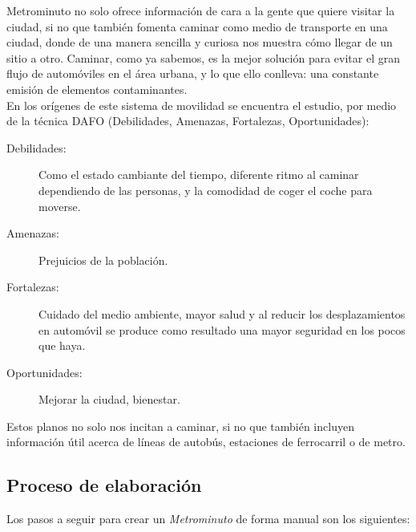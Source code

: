 Metrominuto no solo ofrece información de cara a la gente que quiere visitar la ciudad, si no que también fomenta caminar como medio de transporte en una ciudad, donde de una manera sencilla y curiosa nos muestra cómo llegar de un sitio a otro. Caminar, como ya sabemos, es la mejor solución para evitar el gran flujo de automóviles en el área urbana, y lo que ello conlleva: una constante emisión de elementos contaminantes. \\
En los orígenes de este sistema de movilidad se encuentra el estudio, por medio de la técnica DAFO (Debilidades, Amenazas, Fortalezas, Oportunidades):

\begin{description}
	\item[Debilidades:] Como el estado cambiante del tiempo, diferente ritmo al caminar dependiendo de las personas, y la comodidad de coger el coche para moverse.
	\item[Amenazas:] Prejuicios de la población.
	\item[Fortalezas:] Cuidado del medio ambiente, mayor salud y al reducir los desplazamientos en automóvil se produce como resultado una mayor seguridad en los pocos que haya.
	\item[Oportunidades:] Mejorar la ciudad, bienestar.
\end{description}
Estos planos no solo nos incitan a caminar, si no que también incluyen información útil acerca de líneas de autobús, estaciones de ferrocarril o de metro.

\subsection{Proceso de elaboración}
Los pasos a seguir para crear un \textit{Metrominuto} de forma manual son los siguientes:

